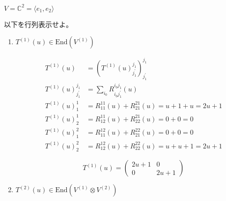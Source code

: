 \documentclass[12pt,a4paper]{ltjsarticle}
\begin{document}
\hrulefill

$V=\mathbb{C}^{2}= \langle e_{1},e_{2}\rangle$

以下を行列表示せよ。
\begin{enumerate}
 \item
      $T^{(1)}(u) \in \mathrm{End} \left( V^{(1)} \right)$

      \dotfill

      \begin{align}
       T^{(1)}(u) &= \left( T^{(1)}(u)^{j_{1}}_{j_{1}^{\prime}} \right)^{j_{1}}_{j_{1}^{\prime}}\\
       T^{(1)}(u)^{j_{1}}_{j_{1}^{\prime}}
       &= \sum_{i_{0}} R^{i_{0}j_{1}}_{i_{0}j_{1}^{\prime}}(u)\\
       T^{(1)}(u)^{1}_{1}
       &= R^{{1}{1}}_{{1}{1}}(u) + R^{{2}{1}}_{{2}{1}}(u) = u+1 + u =2u+1 \\
       T^{(1)}(u)^{1}_{2}
       &= R^{{1}{1}}_{{1}{2}}(u) + R^{{2}{1}}_{{2}{2}}(u) = 0+ 0 =0\\
       T^{(1)}(u)^{2}_{1}
       &= R^{{1}{2}}_{{1}{1}}(u) + R^{{2}{2}}_{{2}{1}}(u) = 0+ 0 =0\\
       T^{(1)}(u)^{2}_{2}
       &= R^{{1}{2}}_{{1}{2}}(u) + R^{{2}{2}}_{{2}{2}}(u) = u + u+1 =2u+1
      \end{align}


      \begin{equation}
       T^{(1)}(u)
        =
        \begin{pmatrix}
         2u+1 & 0\\
         0 & 2u+1
        \end{pmatrix}
      \end{equation}


      \hrulefill

 \item
      $T^{(2)}(u) \in \mathrm{End} \left( V^{(1)}\otimes V^{(2)} \right)$

      \dotfill


\end{enumerate}
\end{document}
